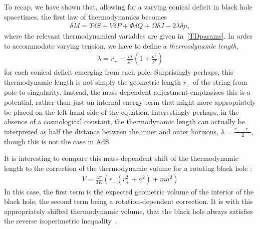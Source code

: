 \documentclass[
twoside,
openright,
frontopenright,
]{dmathesis}
\begin{document}
To recap, we have shown that, allowing for a varying conical deficit
in black hole spacetimes, the first law of thermodynamics becomes
\begin{align}
\delta M = T \delta S + V\delta P + \Phi \delta Q +\Omega\delta J - 2\lambda \delta \mu,
\end{align}
where the relevant thermodynamical variables are given in~\eqref{TDparams}.
In order to accommodate varying 
tension, we have to define a \emph{thermodynamic length},
\begin{align}\lambda = r_+ -
\frac{m}{\Xi^2}\left(1+\frac{a^2}{\ell^2}\right)
\end{align}
for each conical deficit emerging from each pole. Surprisingly perhaps, this
thermodynamic length is not simply the geometric length $r_+$ of the string from
pole to singularity.  Instead, the mass-dependent adjustment emphasises this is
a potential, rather than just an internal energy term that might more
appropriately be placed on the left hand side of the equation. Interestingly
perhaps, in the absence of a cosmological constant, the thermodynamic length can
actually be interpreted as half the distance between the inner and outer horizons,
$\lambda = \frac{r_+ - r_-}{2}$, though this is not the case in AdS.

It is interesting to compare this mass-dependent shift of the thermodynamic
length to the correction of the thermodynamic volume for a rotating black
hole \cite{Cvetic:2010jb,Dolan:2011jm}:
\begin{align}
V = \frac{4\pi}{3K} \left(r_+(r_+^2+a^2) + m a^2\right)
\end{align}
In this case, the first term is the expected geometric volume of the interior of
the black hole, the second term being a rotation-dependent correction. It is
with this appropriately shifted thermodynamic volume, that the black hole always
satisfies the reverse isoperimetric inequality~\cite{Cvetic:2010jb}.
\end{document}

